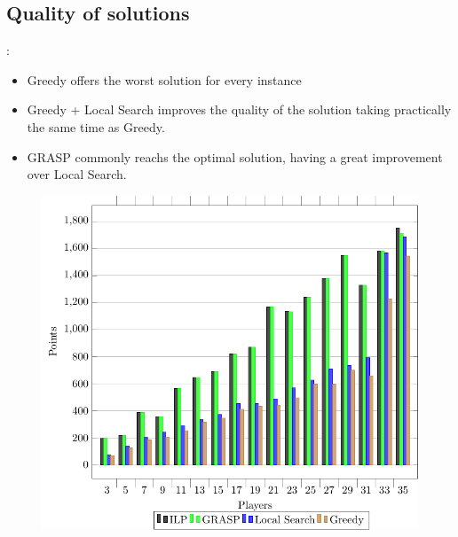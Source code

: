\documentclass[9pt, aspectratio=169, xcolor=table]{beamer}
\begin{document}
\subsection{Quality of solutions}
\begin{frame}{\secname: \subsecname}
    \begin{minipage}{0.44\textwidth}
	\begin{itemize}
	    \item Greedy offers the worst solution for every instance
	    \item Greedy + Local Search improves the quality of the solution taking practically the same time as Greedy.
      \item GRASP commonly reachs the optimal solution, having a great improvement over Local  Search.
	\end{itemize}
    \end{minipage}
    \hfill
    \begin{minipage}{0.52\textwidth}
	\centering
	\begin{figure}[H]
	    \centering
	    \includegraphics[width=\linewidth]{../plots/solutions.pdf}
	\end{figure}
    \end{minipage}
\end{frame}
\end{document}

